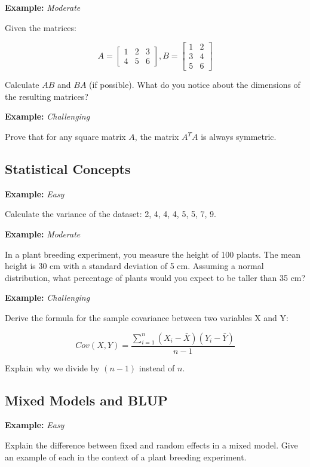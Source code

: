 \documentclass[12pt,a4paper]{article}
\newenvironment{example}[1][]
{\begin{basebox}[linecolor=uqgold]
\textbf{\color{uqgold}Example:} \textit{#1}\par\noindent\ignorespaces}
{\end{basebox}}
\begin{document}
\begin{example}[Moderate]
Given the matrices:

\[
A = \begin{bmatrix}
1 & 2 & 3 \\
4 & 5 & 6
\end{bmatrix},
B = \begin{bmatrix}
1 & 2 \\
3 & 4 \\
5 & 6
\end{bmatrix}
\]

Calculate $AB$ and $BA$ (if possible). What do you notice about the dimensions of the resulting matrices?
\end{example}

\begin{example}[Challenging]
Prove that for any square matrix $A$, the matrix $A^TA$ is always symmetric.
\end{example}

\subsection{Statistical Concepts}

\begin{example}[Easy]
Calculate the variance of the dataset: 2, 4, 4, 4, 5, 5, 7, 9.
\end{example}

\begin{example}[Moderate]
In a plant breeding experiment, you measure the height of 100 plants. The mean height is 30 cm with a standard deviation of 5 cm. Assuming a normal distribution, what percentage of plants would you expect to be taller than 35 cm?
\end{example}

\begin{example}[Challenging]
Derive the formula for the sample covariance between two variables X and Y:

\[
Cov(X,Y) = \frac{\sum_{i=1}^n (X_i - \bar{X})(Y_i - \bar{Y})}{n - 1}
\]

Explain why we divide by $(n-1)$ instead of $n$.
\end{example}

\subsection{Mixed Models and BLUP}

\begin{example}[Easy]
Explain the difference between fixed and random effects in a mixed model. Give an example of each in the context of a plant breeding experiment.
\end{example}
\end{document}
